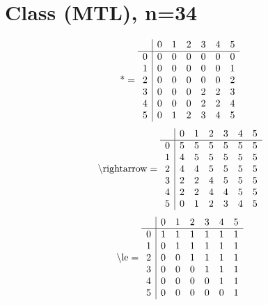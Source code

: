 \documentclass[11pt]{article}
\begin{document}
\section{Class (MTL), n=34}
\[\text{*} = 
\begin{array}{r | r r r r r r}
 & 0 & 1 & 2 & 3 & 4 & 5 \\ \hline
0 & 0 & 0 & 0 & 0 & 0 & 0 \\
1 & 0 & 0 & 0 & 0 & 0 & 1 \\
2 & 0 & 0 & 0 & 0 & 0 & 2 \\
3 & 0 & 0 & 0 & 2 & 2 & 3 \\
4 & 0 & 0 & 0 & 2 & 2 & 4 \\
5 & 0 & 1 & 2 & 3 & 4 & 5 \\
\end{array}
\]
\[\text{\textbackslash rightarrow} = 
\begin{array}{r | r r r r r r}
 & 0 & 1 & 2 & 3 & 4 & 5 \\ \hline
0 & 5 & 5 & 5 & 5 & 5 & 5 \\
1 & 4 & 5 & 5 & 5 & 5 & 5 \\
2 & 4 & 4 & 5 & 5 & 5 & 5 \\
3 & 2 & 2 & 4 & 5 & 5 & 5 \\
4 & 2 & 2 & 4 & 4 & 5 & 5 \\
5 & 0 & 1 & 2 & 3 & 4 & 5 \\
\end{array}
\]
\[\text{\textbackslash le} = 
\begin{array}{r | r r r r r r}
 & 0 & 1 & 2 & 3 & 4 & 5 \\ \hline
0 & 1 & 1 & 1 & 1 & 1 & 1 \\
1 & 0 & 1 & 1 & 1 & 1 & 1 \\
2 & 0 & 0 & 1 & 1 & 1 & 1 \\
3 & 0 & 0 & 0 & 1 & 1 & 1 \\
4 & 0 & 0 & 0 & 0 & 1 & 1 \\
5 & 0 & 0 & 0 & 0 & 0 & 1 \\
\end{array}
\]
\end{document}
